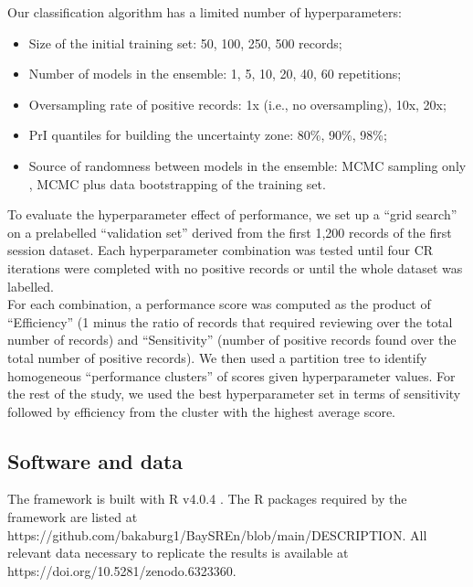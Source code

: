\documentclass[]{bmcart}
\providecommand{\tightlist}{ %
  \setlength{\itemsep}{0pt}\setlength{\parskip}{0pt}
  }
\begin{document}
Our classification algorithm has a limited number of hyperparameters:

\begin{itemize}
\tightlist
\item
  Size of the initial training set: 50, 100, 250, 500 records;
\item
  Number of models in the ensemble: 1, 5, 10, 20, 40, 60 repetitions;
\item
  Oversampling rate of positive records: 1x (i.e., no oversampling),
  10x, 20x;
\item
  PrI quantiles for building the uncertainty zone: 80\%, 90\%, 98\%;
\item
  Source of randomness between models in the ensemble: MCMC sampling
  only \citep{robert2004monte}, MCMC plus data bootstrapping
  \citep{breiman1996bagging} of the training set.
\end{itemize}

To evaluate the hyperparameter effect of performance, we set up a ``grid
search'' \citep{claesen2015hyperparameter, yang2020hyperparameter} on a
prelabelled ``validation set'' derived from the first 1,200 records of
the first session dataset. Each hyperparameter combination was tested
until four CR iterations were completed with no positive records or
until the whole dataset was labelled.\\
For each combination, a performance score was computed as the product of
``Efficiency'' (1 minus the ratio of records that required reviewing
over the total number of records) and ``Sensitivity'' (number of
positive records found over the total number of positive records). We
then used a partition tree \citep{rpart} to identify homogeneous
``performance clusters'' of scores given hyperparameter values. For the
rest of the study, we used the best hyperparameter set in terms of
sensitivity followed by efficiency from the cluster with the highest
average score.\\

\subsection*{Software and data}

The framework is built with R v4.0.4 \citep{rstats2021}. The R packages
required by the framework are listed at
https://github.com/bakaburg1/BaySREn/blob/main/DESCRIPTION. All relevant
data necessary to replicate the results is available at
https://doi.org/10.5281/zenodo.6323360.
\end{document}
